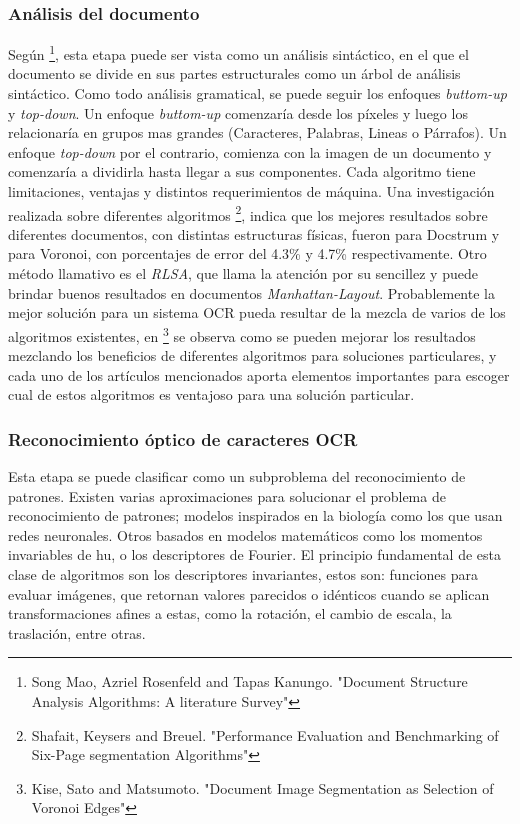 \documentclass[a4paper, 11pt, oneside]{article}
\begin{document}
	\subsubsection{Análisis del documento}
	Según \footnote{Song Mao, Azriel Rosenfeld and Tapas Kanungo. "Document Structure Analysis
	Algorithms: A literature Survey"}, esta etapa puede ser vista como un análisis sintáctico,
	en el que el documento se divide en sus partes estructurales como un árbol de análisis
	sintáctico. Como todo análisis gramatical, se puede seguir los enfoques
	\textit{buttom-up} y \textit{top-down}. Un enfoque \textit{buttom-up} comenzaría desde
	los píxeles y luego los relacionaría en grupos mas grandes (Caracteres, Palabras, Lineas
	o Párrafos). Un enfoque \textit{top-down} por el contrario, comienza con la imagen de un
	documento y comenzaría a dividirla hasta llegar a sus componentes.
	Cada algoritmo tiene limitaciones, ventajas y distintos requerimientos de máquina.
	Una investigación realizada sobre diferentes algoritmos \footnote{Shafait, Keysers and Breuel.
	"Performance Evaluation and Benchmarking of Six-Page segmentation Algorithms"}, indica que los
	mejores resultados sobre diferentes documentos, con distintas estructuras físicas,
	fueron para Docstrum y para Voronoi, con porcentajes de error del 4.3\% y 4.7\% respectivamente.
	Otro método	llamativo es el \textit{RLSA}, que llama la atención por su sencillez y puede brindar
	buenos resultados en documentos \textit{Manhattan-Layout}.
	Probablemente la mejor solución para un sistema OCR pueda resultar de la mezcla de
	varios de los algoritmos existentes, en \footnote{Kise, Sato and Matsumoto. "Document Image 
	Segmentation as Selection of Voronoi Edges"} se observa como se pueden mejorar
	los resultados mezclando los beneficios de diferentes algoritmos para soluciones
	particulares, y cada uno de los artículos mencionados aporta elementos importantes para
    escoger cual de estos algoritmos es ventajoso para una solución particular.
	
	\subsubsection{Reconocimiento óptico de caracteres OCR}
	Esta etapa se puede clasificar como un subproblema del reconocimiento de patrones.
	Existen varias aproximaciones para solucionar el problema de reconocimiento de patrones; 
	modelos inspirados en la biología como los que usan redes neuronales. Otros
	basados en modelos matemáticos como los momentos invariables de hu, o los
	descriptores de Fourier. El principio fundamental de esta clase de algoritmos son
	los descriptores invariantes, estos son: funciones para evaluar imágenes, que retornan valores 
	parecidos o idénticos cuando se aplican	transformaciones afines a estas, como la rotación,
	el cambio de escala, la traslación, entre otras. \newline	
	
\end{document}
